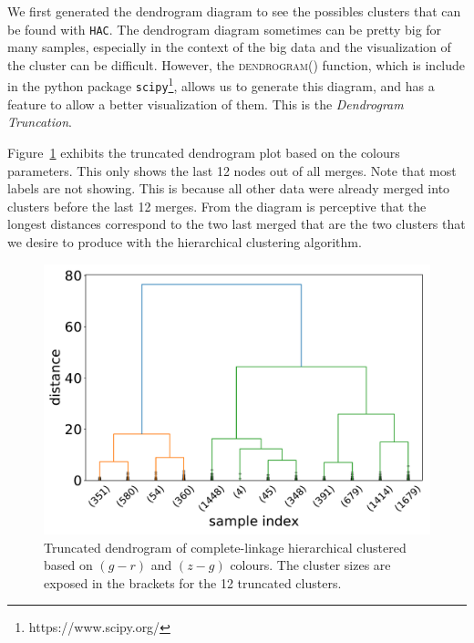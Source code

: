 \documentclass[fleqn,usenatbib]{mnras}
\begin{document}
We first generated the dendrogram diagram to see the possibles clusters that can be found with
\texttt{HAC}. The dendrogram diagram sometimes can be pretty big for many samples, 
especially in the
context of the big data and the visualization of the cluster can be difficult. However, 
the \textsc{dendrogram()} function, which is 
include in the python package \texttt{scipy}\footnote{https://www.scipy.org/}, allows us 
to generate this diagram, and has a feature to allow a better visualization of them. 
This is the \textit{Dendrogram Truncation}. 

Figure~\ref{fig:dendrogram} exhibits the truncated dendrogram plot based on the colours
parameters. This only shows the last 12 nodes out of all merges. Note that most labels are not showing. 
This is because all other data were already merged into clusters before the last 12 merges. 
From the diagram is perceptive that the longest distances correspond to 
the two last merged that are the two clusters that we desire to produce with 
the hierarchical clustering algorithm.

\begin{figure}
	\includegraphics[width=0.9\linewidth]{Figs/Customer-Dendrograms.pdf}
    \caption{Truncated dendrogram of complete-linkage hierarchical clustered based on $(g - r)$ and $(z - g)$ colours.
    The cluster sizes are exposed in the brackets for the 12 truncated clusters.}
    \label{fig:dendrogram}
\end{figure}
\end{document}
